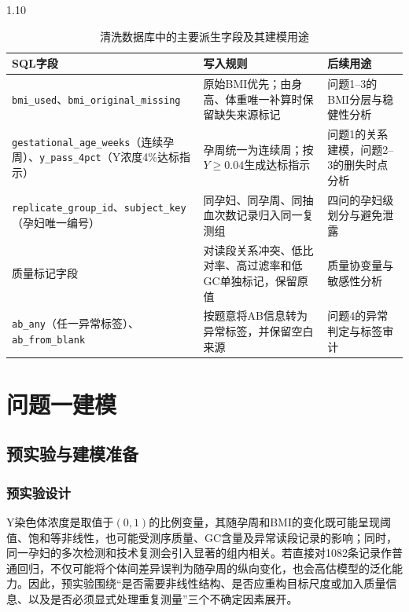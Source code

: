 \documentclass[12pt,a4paper]{ctexrep}
\numberwithin{equation}{section}
\begin{document}
\begin{spacing}{1.10}
{			\begin{table}[!htbp]
			\centering
			\scriptsize
			\renewcommand{\arraystretch}{1.12}
			\caption{清洗数据库中的主要派生字段及其建模用途}
			\label{tab:sql_features}
			\begin{tabular}{>{\raggedright\arraybackslash}p{}>{\raggedright\arraybackslash}p{}>{\raggedright\arraybackslash}p{}}
			\toprule
			SQL字段 & 写入规则 & 后续用途 \\
			\midrule
			\texttt{bmi\_used}、\texttt{bmi\_original\_missing} & 原始BMI优先；由身高、体重唯一补算时保留缺失来源标记 & 问题1--3的BMI分层与稳健性分析 \\
			\texttt{gestational\_age\_weeks}（连续孕周）、\texttt{y\_pass\_4pct}（Y浓度4\%达标指示） & 孕周统一为连续周；按$Y\geq0.04$生成达标指示 & 问题1的关系建模，问题2--3的删失时点分析 \\
			\texttt{replicate\_group\_id}、\texttt{subject\_key}（孕妇唯一编号） & 同孕妇、同孕周、同抽血次数记录归入同一复测组 & 四问的孕妇级划分与避免泄露 \\
			质量标记字段 & 对读段关系冲突、低比对率、高过滤率和低GC单独标记，保留原值 & 质量协变量与敏感性分析 \\
			\texttt{ab\_any}（任一异常标签）、\texttt{ab\_from\_blank} & 按题意将AB信息转为异常标签，并保留空白来源 & 问题4的异常判定与标签审计 \\
			\bottomrule
			\end{tabular}
			\end{table}
		
			\section{问题一建模}
			\subsection{预实验与建模准备}
			\subsubsection{预实验设计}
			Y染色体浓度是取值于$(0,1)$的比例变量，其随孕周和BMI的变化既可能呈现阈值、饱和等非线性，也可能受测序质量、GC含量及异常读段记录的影响；同时，同一孕妇的多次检测和技术复测会引入显著的组内相关。若直接对1082条记录作普通回归，不仅可能将个体间差异误判为随孕周的纵向变化，也会高估模型的泛化能力。因此，预实验围绕``是否需要非线性结构、是否应重构目标尺度或加入质量信息、以及是否必须显式处理重复测量''三个不确定因素展开。

}
\end{spacing}
\end{document}
